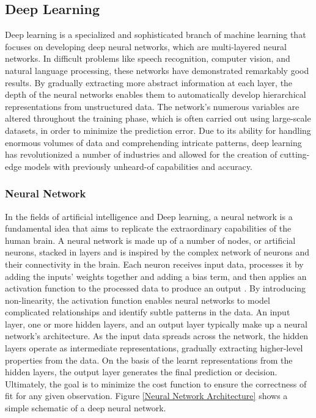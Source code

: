 \documentclass[a4paper,12pt]{report}%
\renewcommand{\\}{\vspace*{0.5\baselineskip} \newline}
\begin{document}
\subsection{Deep Learning}
Deep learning is a specialized and sophisticated branch of machine learning that focuses on developing deep neural networks, which are multi-layered neural networks. In difficult problems like speech recognition, computer vision, and natural language processing, these networks have demonstrated remarkably good results. By gradually extracting more abstract information at each layer, the depth of the neural networks enables them to automatically develop hierarchical representations from unstructured data. The network's numerous variables are altered throughout the training phase, which is often carried out using large-scale datasets, in order to minimize the prediction error. Due to its ability for handling enormous volumes of data and comprehending intricate patterns, deep learning has revolutionized a number of industries and allowed for the creation of cutting-edge models with previously unheard-of capabilities and accuracy.

\subsubsection{Neural Network}
In the fields of artificial intelligence and Deep learning, a neural network is a fundamental idea that aims to replicate the extraordinary capabilities of the human brain. A neural network is made up of a number of nodes, or artificial neurons, stacked in layers and is inspired by the complex network of neurons and their connectivity in the brain. Each neuron receives input data, processes it by adding the inputs' weights together and adding a bias term, and then applies an activation function to the processed data to produce an output \cite{20}. By introducing non-linearity, the activation function enables neural networks to model complicated relationships and identify subtle patterns in the data.
An input layer, one or more hidden layers, and an output layer typically make up a neural network's architecture. As the input data spreads across the network, the hidden layers operate as intermediate representations, gradually extracting higher-level properties from the data. On the basis of the learnt representations from the hidden layers, the output layer generates the final prediction or decision. Ultimately, the goal is to minimize the cost function to ensure the correctness of fit for any given observation.\cite{21} Figure \ref{Neural Network Architecture} shows a simple schematic of a deep neural network.
\end{document}
